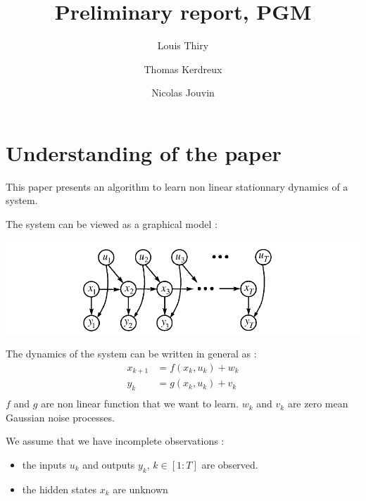 \documentclass[11pt, oneside]{amsart}
\title[]{Preliminary report, PGM}
\author[1]{Louis Thiry}
\author[2]{Thomas Kerdreux}
\author[3]{Nicolas Jouvin}
\begin{document}
\maketitle

\section{Understanding of the paper}

This paper presents an algorithm to learn non linear stationnary dynamics of a system.

The system can be viewed as a graphical model :

\includegraphics[width=14cm]{screenshot_graphical_model.PNG}

The dynamics of the system can be written in general as :
\begin{align*}
  x_{k+1} &= f(x_k, u_k) + w_k\\
  y_k &= g(x_k, u_k) + v_k\\
\end{align*}
$f$  and  $g$  are non linear function that we want to learn.
$w_k$ and  $v_k$ are zero mean Gaussian noise processes.

We assume that we have incomplete observations :
\begin{itemize}
  \item the inputs $u_k$ and outputs $y_k$, $k \in [1:T]$ are observed.
  \item the hidden states $x_k$ are unknown
\end{itemize}
\end{document}
